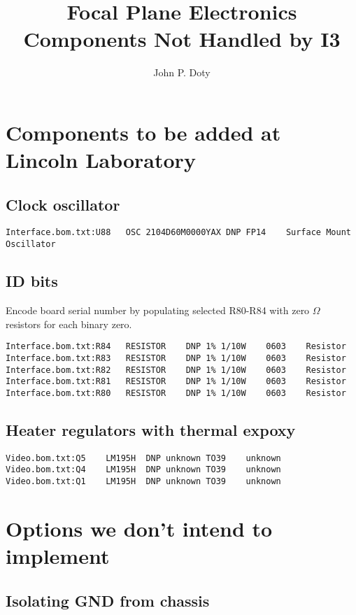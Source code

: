 \documentclass[11pt]{article}
\author{
John P. Doty
}
\title{Focal Plane Electronics Components Not Handled by I3}
\date{}
\begin{document}
\maketitle
\begin{center}

\end{center}


\section{Components to be added at Lincoln Laboratory}
\subsection{Clock oscillator}
\begin{verbatim}
Interface.bom.txt:U88	OSC	2104D60M0000YAX	DNP	FP14	Surface Mount Oscillator	
\end{verbatim}

\subsection{ID bits}

Encode board serial number
by populating selected R80-R84
with zero $\Omega$ resistors for
each binary zero.

\begin{verbatim}
Interface.bom.txt:R84	RESISTOR	DNP	1% 1/10W	0603	Resistor	
Interface.bom.txt:R83	RESISTOR	DNP	1% 1/10W	0603	Resistor	
Interface.bom.txt:R82	RESISTOR	DNP	1% 1/10W	0603	Resistor	
Interface.bom.txt:R81	RESISTOR	DNP	1% 1/10W	0603	Resistor	
Interface.bom.txt:R80	RESISTOR	DNP	1% 1/10W	0603	Resistor	
\end{verbatim}

\subsection{Heater regulators with thermal expoxy}
\begin{verbatim}
Video.bom.txt:Q5	LM195H	DNP	unknown	TO39	unknown	
Video.bom.txt:Q4	LM195H	DNP	unknown	TO39	unknown	
Video.bom.txt:Q1	LM195H	DNP	unknown	TO39	unknown	
\end{verbatim}


\section{Options we don't intend to implement}

\subsection{Isolating GND from chassis}
\end{document}
